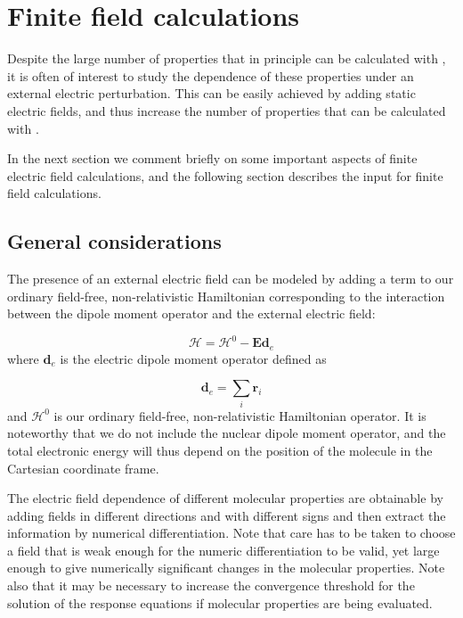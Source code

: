 \chapter{Finite field calculations}\label{ch:finite}

Despite the large number of properties that in principle can be
calculated with \siraba , it is often of interest to study the
dependence of these properties under an external electric
perturbation. This can be easily achieved by adding static electric
fields, and thus increase the number of properties
that can be 
calculated with \siraba .

In the next section we comment briefly on some important aspects of
finite electric field calculations, and the following section
describes the input for finite field calculations.

\section{General considerations}\label{sec:finitegeneral}

The presence of an external electric field can be modeled by adding a
term to our ordinary field-free, non-relativistic Hamiltonian
corresponding to the interaction between the dipole moment operator
and the external electric field:

\begin{equation}
\mathcal{H} = \mathcal{H}^{0} - \mathbf{Ed}_{e}
\end{equation}
where $\mathbf{d}_{e}$ is the electric dipole moment operator defined as 

\begin{equation}
\mathbf{d}_{e} = \sum_{i}\mathbf{r}_{i}
\end{equation}
and $\mathcal{H}^{0}$ is our ordinary field-free, non-relativistic
Hamiltonian operator. It is noteworthy that we do not include the
nuclear dipole moment operator, and the
total electronic energy will 
thus depend on the position of the molecule in the Cartesian
coordinate frame.

The electric field dependence of different molecular properties are
obtainable by adding fields in different directions and with different
signs and then extract the information by numerical
differentiation. Note that care has
to be taken to choose a field that 
is weak enough for the numeric differentiation to be valid,
yet large enough to give numerically significant changes in the
molecular properties. Note also that it may be necessary to increase
the convergence threshold for the solution of the response equations
if molecular properties are being evaluated.

